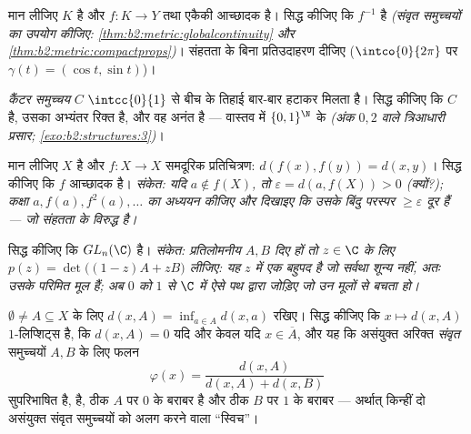 \begin{exercise}[$\star\star$]\label{exo:b2:metric:7}
मान लीजिए $K$  है और $f \colon K \to Y$  तथा एकैकी आच्छादक है। सिद्ध कीजिए कि
$f^{-1}$  है \emph{(संवृत समुच्चयों का उपयोग कीजिए: \cref{thm:b2:metric:globalcontinuity} और \cref{thm:b2:metric:compactprops})}। संहतता
के बिना प्रतिउदाहरण दीजिए ($\intco{0}{2\pi}$ पर $\gamma(t) = (\cos t, \sin t)$)।
\end{exercise}

\begin{exercise}[$\star\star$]\label{exo:b2:metric:8}
\emph{कैंटर समुच्चय} $C$ $\intcc{0}{1}$ से बीच के  तिहाई बार-बार हटाकर मिलता
है। सिद्ध कीजिए कि $C$  है, उसका अभ्यंतर रिक्त है, और वह अनंत है
--- वास्तव में $\{0,1\}^{\N}$ के  \emph{(अंक $0,2$ वाले त्रिआधारी प्रसार;
\cref{exo:b2:structures:3})}।
\end{exercise}

\begin{exercise}[$\star\star\star$]\label{exo:b2:metric:9}
मान लीजिए $X$ \emph{}  है और $f \colon X \to X$ समदूरिक प्रतिचित्रण:
$d(f(x), f(y)) = d(x, y)$। सिद्ध कीजिए कि $f$ आच्छादक है। \emph{संकेत: यदि $a \notin f(X)$, तो $\varepsilon = d(a, f(X)) > 0$
(क्यों?); कक्षा $a, f(a), f^2(a), \dots$ का अध्ययन कीजिए और दिखाइए कि उसके बिंदु परस्पर $\geq \varepsilon$
दूर हैं --- जो संहतता के विरुद्ध है।}
\end{exercise}

\begin{exercise}[$\star\star\star$]\label{exo:b2:metric:10}
सिद्ध कीजिए कि $GL_n(\C)$  है। \emph{संकेत: प्रतिलोमनीय $A, B$ दिए हों
तो $z
\in \C$ के लिए $p(z) = \det\bigl((1 - z)A + zB\bigr)$ लीजिए: यह $z$ में एक बहुपद है जो सर्वथा शून्य नहीं,
अतः उसके परिमित मूल हैं; अब $0$ को $1$ से $\C$ में ऐसे पथ द्वारा जोड़िए
जो उन मूलों से बचता हो।}
\end{exercise}

\begin{exercise}[$\star\star$]\label{exo:b2:metric:11}
$\emptyset \neq A \subseteq X$ के लिए $d(x, A) = \inf_{a \in A}
d(x, a)$ रखिए। सिद्ध कीजिए कि $x \mapsto d(x, A)$ $1$-लिप्शिट्स है, कि $d(x, A) = 0$ यदि
और केवल यदि $x \in \overline A$, और यह कि असंयुक्त अरिक्त \emph{संवृत} समुच्चयों $A, B$
के लिए फलन
\[
\varphi(x) = \frac{d(x, A)}{d(x, A) + d(x, B)}
\]
सुपरिभाषित है,  है, ठीक $A$ पर $0$ के बराबर है और ठीक $B$ पर
$1$ के बराबर --- अर्थात् किन्हीं दो असंयुक्त संवृत समुच्चयों को अलग
करने वाला  ``स्विच''।
\end{exercise}

